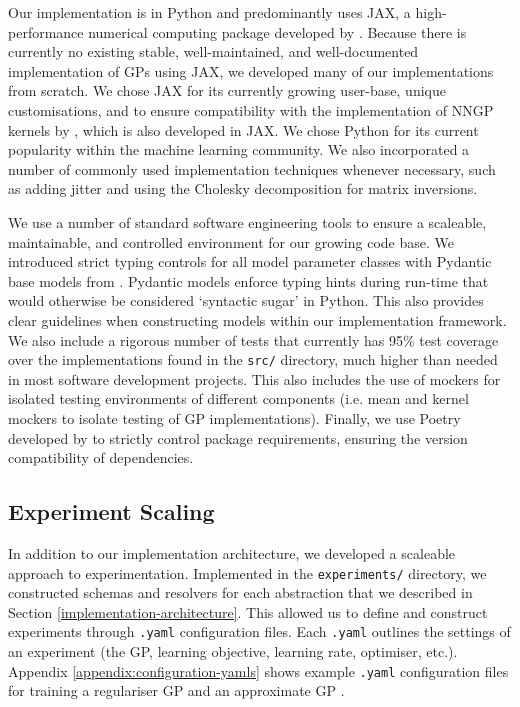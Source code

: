 \documentclass{article}
\def\code#1{\texttt{#1}}
\numberwithin{equation}{section}
\begin{document}
Our implementation is in Python and predominantly uses JAX, a high-performance numerical computing package developed by \cite{jax2018github}.
Because there is currently no existing stable, well-maintained, and well-documented implementation of GPs using JAX, we developed many of our implementations from scratch.
We chose JAX for its currently growing user-base, unique customisations, and to ensure compatibility with the implementation of NNGP kernels by \cite{novak2019neural}, which is also developed in JAX.
We chose Python for its current popularity within the machine learning community.
We also incorporated a number of commonly used implementation techniques whenever necessary, such as adding jitter and using the Cholesky decomposition for matrix inversions.

We use a number of standard software engineering tools to ensure a scaleable, maintainable, and controlled environment for our growing code base.
We introduced strict typing controls for all model parameter classes with Pydantic base models from \cite{samuel_colvin_2023_8277473}.
Pydantic models enforce typing hints during run-time that would otherwise be considered `syntactic sugar' in Python. This also provides clear guidelines when constructing models within our implementation framework.
We also include a rigorous number of tests that currently has 95\% test coverage over the implementations found in the \code{src/} directory, much higher than needed in most software development projects.
This also includes the use of mockers for isolated testing environments of different components (i.e. mean and kernel mockers to isolate testing of GP implementations). 
Finally, we use Poetry developed by \cite{Eustace} to strictly control package requirements, ensuring the version compatibility of dependencies.

\subsection{Experiment Scaling}
In addition to our implementation architecture, we developed a scaleable approach to experimentation.
Implemented in the \code{experiments/} directory, we constructed schemas and resolvers for each abstraction that we described in Section \ref{implementation-architecture}.
This allowed us to define and construct experiments through \code{.yaml} configuration files.
Each \code{.yaml} outlines the settings of an experiment (the GP, learning objective, learning rate, optimiser, etc.).
Appendix \ref{appendix:configuration-yamls} shows example \code{.yaml} configuration files for training a regulariser GP and an approximate GP .
\end{document}
